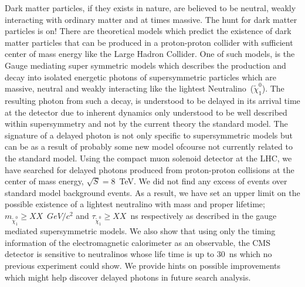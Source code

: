 
Dark matter particles, if they exists in nature, are believed to be neutral, weakly interacting with ordinary matter and at times massive. The hunt for dark matter particles is on! There are theoretical models which predict the  existence of dark matter particles that can be produced in a proton-proton collider with sufficient center of mass energy like the Large Hadron Collider. One of such models, is the Gauge mediating super symmetric models which describes the production and decay into isolated energetic photons of supersymmetric particles which are massive, neutral and weakly interacting like the lightest Neutralino~($\tilde{\chi}^{0}_{1}$). The resulting photon from such a decay, is understood to be delayed in its arrival time at the detector due to inherent dynamics only understood to be well described within supersymmetry  and not by the current theory the standard model. The signature of a delayed photon is not only specific to supersymmetric models but can be as a result of probably some new model ofcourse not currently related to the standard model. Using the compact muon solenoid detector at the LHC, we have searched for delayed photons produced from proton-proton collisions at the center of mass energy, $\sqrt{S} = 8$~TeV. We did not find any excess of events over standard model background events. As a result, we have set an upper limit on the possible existence of a lightest neutralino with  mass and proper lifetime; $m_{\tilde{\chi}^{0}_{1}} \geq XX$~$GeV/c^{2}$ and $\tau_{\tilde{\chi}^{0}_{1}} \geq XX$~ns respectively as described in the gauge mediated supersymmetric models. We also show that using only the timing information of the electromagnetic calorimeter as an observable, the  CMS detector is sensitive to neutralinos whose life time is up to $30$~ns which no previous experiment could show. We provide hints on possible improvements which might help discover delayed photons in future search analysis.
